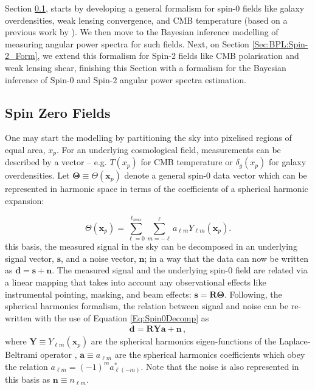 \qquad Section \ref{Sec:BPL:Spin-0_Form}, starts by developing a general formalism for spin-0 fields like galaxy overdensities, weak lensing convergence, and CMB temperature (based on a previous work by \cite{Taylor2008}). We then move to the Bayesian inference modelling of measuring angular power spectra for such fields. Next, on Section \ref{Sec:BPL:Spin-2_Form}, we extend this formalism for Spin-2 fields like CMB polarisation and weak lensing shear, finishing this Section with a formalism for the Bayesian inference of Spin-0 and Spin-2 angular power spectra estimation.


\subsection{Spin Zero Fields}\label{Sec:BPL:Spin-0_Form}
One may start the modelling by partitioning the sky into pixelised regions of equal area, $x_p$. For an underlying cosmological field, measurements can be described by a vector -- e.g. $T(x_p)$ for CMB temperature or $\delta_g (x_p)$ for galaxy overdensities. Let $\mathbf{\Theta} \equiv \Theta(\mathbf{x}_p)$ denote a general spin-0 data vector which can be represented in harmonic space in terms of the coefficients of a spherical harmonic expansion:

\begin{equation}
\Theta (\mathbf{x}_p) = \sum_{\ell=0}^{\ell_{max}}\sum_{m=-\ell}^{\ell}a_{\ell m}Y_{\ell m}(\mathbf{x}_p).
\label{Eq:Spin0Decomp}
\end{equation}
\noindent this basis, the measured signal in the sky can be decomposed in an underlying signal vector, $\mathbf{s}$, and a noise vector, $\mathbf{n}$; in a way that the data can now be written as $\mathbf{d=s+n}$. The measured signal and the underlying spin-0 field are related via a linear mapping that takes into account any observational effects like instrumental pointing, masking, and beam effects: $\mathbf{s = R\Theta}$. Following, the spherical harmonics formalism, the relation between signal and noise can be re-written with the use of Equation \eqref{Eq:Spin0Decomp} as
\begin{align}
\mathbf{d=RYa+n}\, ,
\label{Eq:DataDecomposed}
\end{align}
\noindent  where $\mathbf{Y} \equiv Y_{\ell m}(\textbf{x}_p)$ are the spherical harmonics eigen-functions of the Laplace-Beltrami operator \citep{2008DahlenSimons}, $\mathbf{a} \equiv a_{\ell m}$ are the spherical harmonics coefficients which obey the relation $a_{\ell m} = (-1)^{m}a^*_{\ell (-m)}$. Note that the noise is also represented in this basis as $\textbf{n} \equiv n_{\ell m}$. 

